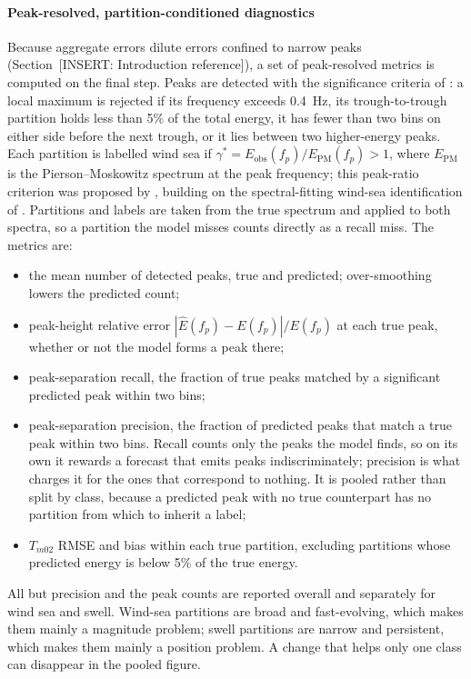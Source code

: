 \paragraph{Peak-resolved, partition-conditioned diagnostics}
Because aggregate errors dilute errors confined to narrow peaks (Section~[INSERT: Introduction reference]), a set of peak-resolved metrics is computed on the final step. Peaks are detected with the significance criteria of \citet{portilla2009}: a local maximum is rejected if its frequency exceeds 0.4~Hz, its trough-to-trough partition holds less than 5\% of the total energy, it has fewer than two bins on either side before the next trough, or it lies between two higher-energy peaks. Each partition is labelled wind sea if $\gamma^{*} = E_{\text{obs}}(f_p)/E_{\text{PM}}(f_p) > 1$, where $E_{\text{PM}}$ is the Pierson--Moskowitz spectrum at the peak frequency; this peak-ratio criterion was proposed by \citet{portilla2009}, building on the spectral-fitting wind-sea identification of \citet{violantecarvalho2002}. Partitions and labels are taken from the true spectrum and applied to both spectra, so a partition the model misses counts directly as a recall miss. The metrics are:
\begin{itemize}
  \item the mean number of detected peaks, true and predicted; over-smoothing lowers the predicted count;
  \item peak-height relative error $|\hat{E}(f_p) - E(f_p)|/E(f_p)$ at each true peak, whether or not the model forms a peak there;
  \item peak-separation recall, the fraction of true peaks matched by a significant predicted peak within two bins;
  \item peak-separation precision, the fraction of predicted peaks that match a true peak within two bins. Recall counts only the peaks the model finds, so on its own it rewards a forecast that emits peaks indiscriminately; precision is what charges it for the ones that correspond to nothing. It is pooled rather than split by class, because a predicted peak with no true counterpart has no partition from which to inherit a label;
  \item $T_{m02}$ RMSE and bias within each true partition, excluding partitions whose predicted energy is below 5\% of the true energy.
\end{itemize}
All but precision and the peak counts are reported overall and separately for wind sea and swell. Wind-sea partitions are broad and fast-evolving, which makes them mainly a magnitude problem; swell partitions are narrow and persistent, which makes them mainly a position problem. A change that helps only one class can disappear in the pooled figure.
 
